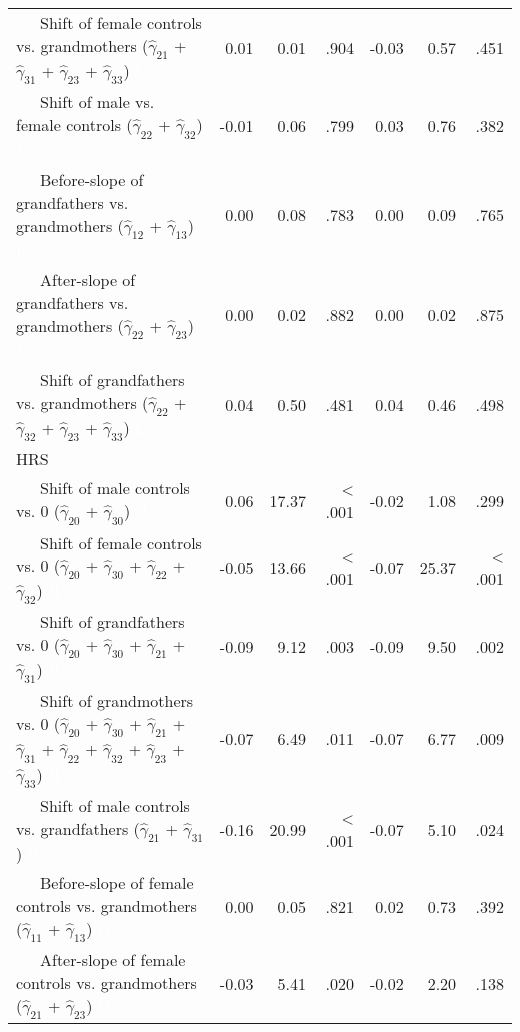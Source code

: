 \documentclass[
  english,
  man, noextraspace]{apa7}
\newenvironment{lltable}{\begin{landscape}\begin{center}\begin{ThreePartTable}}{\end{ThreePartTable}\end{center}\end{landscape}}
\begin{document}
\begin{appendix}
\begin{lltable}
{\begin{longtable}{lrrrrrr}
\ \ \ Shift of female controls vs. grandmothers 
($\hat{\gamma}_{21}$ + $\hat{\gamma}_{31}$ + 
$\hat{\gamma}_{23}$ + $\hat{\gamma}_{33}$) \textcolor{white}{L} & 0.01 & 0.01 & .904 & -0.03 & 0.57 & .451\\
\ \ \ Shift of male vs. female controls 
($\hat{\gamma}_{22}$ + $\hat{\gamma}_{32}$) \textcolor{white}{L} & -0.01 & 0.06 & .799 & 0.03 & 0.76 & .382\\
\ \ \ Before-slope of grandfathers vs. grandmothers 
($\hat{\gamma}_{12}$ + $\hat{\gamma}_{13}$) \textcolor{white}{L} & 0.00 & 0.08 & .783 & 0.00 & 0.09 & .765\\
\ \ \ After-slope of grandfathers vs. grandmothers 
($\hat{\gamma}_{22}$ + $\hat{\gamma}_{23}$) \textcolor{white}{L} & 0.00 & 0.02 & .882 & 0.00 & 0.02 & .875\\
\ \ \ Shift of grandfathers vs. grandmothers 
($\hat{\gamma}_{22}$ + $\hat{\gamma}_{32}$ + 
$\hat{\gamma}_{23}$ + $\hat{\gamma}_{33}$) \textcolor{white}{L} & 0.04 & 0.50 & .481 & 0.04 & 0.46 & .498\\
HRS &  &  &  &  &  & \\
\ \ \ Shift of male controls vs. 0 ($\hat{\gamma}_{20}$ + 
$\hat{\gamma}_{30}$) \textcolor{white}{H} & 0.06 & 17.37 & < .001 & -0.02 & 1.08 & .299\\
\ \ \ Shift of female controls vs. 0 ($\hat{\gamma}_{20}$ + 
$\hat{\gamma}_{30}$ + $\hat{\gamma}_{22}$ + 
$\hat{\gamma}_{32}$) \textcolor{white}{H} & -0.05 & 13.66 & < .001 & -0.07 & 25.37 & < .001\\
\ \ \ Shift of grandfathers vs. 0 ($\hat{\gamma}_{20}$ + 
$\hat{\gamma}_{30}$ + $\hat{\gamma}_{21}$ + 
$\hat{\gamma}_{31}$) \textcolor{white}{H} & -0.09 & 9.12 & .003 & -0.09 & 9.50 & .002\\
\ \ \ Shift of grandmothers vs. 0 ($\hat{\gamma}_{20}$ + 
$\hat{\gamma}_{30}$ + $\hat{\gamma}_{21}$ + 
$\hat{\gamma}_{31}$ + $\hat{\gamma}_{22}$ + 
$\hat{\gamma}_{32}$ + $\hat{\gamma}_{23}$ +
$\hat{\gamma}_{33}$) \textcolor{white}{H} & -0.07 & 6.49 & .011 & -0.07 & 6.77 & .009\\
\ \ \ Shift of male controls vs. grandfathers 
($\hat{\gamma}_{21}$ + $\hat{\gamma}_{31}$) \textcolor{white}{H} & -0.16 & 20.99 & < .001 & -0.07 & 5.10 & .024\\
\ \ \ Before-slope of female controls vs. grandmothers 
($\hat{\gamma}_{11}$ + $\hat{\gamma}_{13}$) \textcolor{white}{H} & 0.00 & 0.05 & .821 & 0.02 & 0.73 & .392\\
\ \ \ After-slope of female controls vs. grandmothers 
($\hat{\gamma}_{21}$ + $\hat{\gamma}_{23}$) \textcolor{white}{H} & -0.03 & 5.41 & .020 & -0.02 & 2.20 & .138\\

\end{longtable}}
\end{lltable}
\end{appendix}
\end{document}
